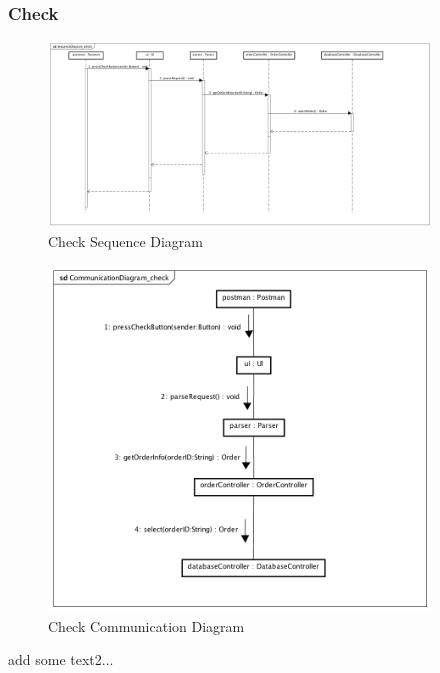 \documentclass[12pt]{scrreprt}
\begin{document}
\subsubsection{Check}
\begin{figure}[H]
  \centering\includegraphics[width=4in]{DocumentRes/2SequenceDiagram_check.png}
  \caption{Check Sequence Diagram}
\end{figure}
\begin{figure}[H]
  \centering\includegraphics[width=4in]{DocumentRes/2CommunicationDiagram_check.png}
  \caption{Check Communication Diagram}
\end{figure}
add some text2...
\end{document}
